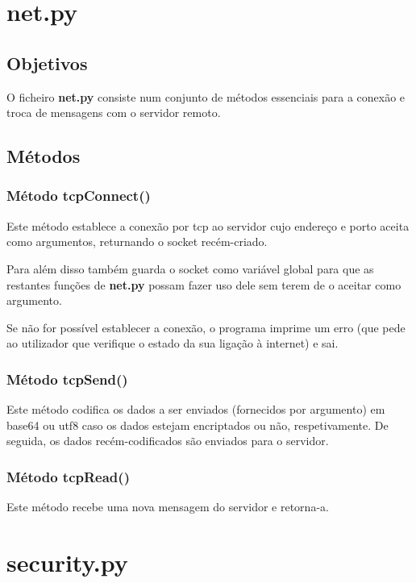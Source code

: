 \documentclass{report}
\begin{document}

\section{net.py}

\subsection{Objetivos}
O ficheiro \textbf{net.py} consiste num conjunto de métodos essenciais para a conexão e troca de mensagens com o servidor remoto.

\subsection{Métodos}
\subsubsection{Método tcpConnect()}
Este método establece a conexão por \ac{tcp} ao servidor cujo endereço e porto aceita como argumentos, returnando o socket recém-criado.

Para além disso também guarda o socket como variável global para que as restantes funções de \textbf{net.py} possam fazer uso dele sem terem de o aceitar como argumento.

Se não for possível establecer a conexão, o programa imprime um erro (que pede ao utilizador que verifique o estado da sua ligação à internet) e sai.

\subsubsection{Método tcpSend()}
Este método codifica os dados a ser enviados (fornecidos por argumento) em base64 ou \ac{utf8} caso os dados estejam encriptados ou não, respetivamente.\newline
De seguida, os dados recém-codificados são enviados para o servidor.

\subsubsection{Método tcpRead()}
Este método recebe uma nova mensagem do servidor e retorna-a.


\section{security.py}
\end{document}
